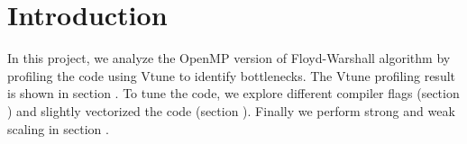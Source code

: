 \section{Introduction}\label{sec:intro}

In this project, we analyze the OpenMP version of Floyd-Warshall algorithm by profiling the code using Vtune to identify bottlenecks. The Vtune profiling result is shown in section . To tune the code, we explore different compiler flags (section ) and slightly vectorized the code (section ). Finally we perform strong and weak scaling in section . 